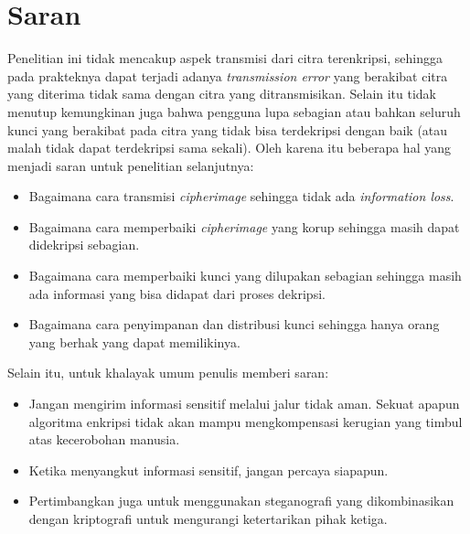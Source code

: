 \section{Saran}
Penelitian ini tidak mencakup aspek transmisi dari citra terenkripsi, sehingga pada prakteknya dapat
terjadi adanya \emph{transmission error} yang berakibat citra yang diterima tidak sama dengan citra 
yang ditransmisikan. Selain itu tidak menutup kemungkinan juga bahwa pengguna lupa sebagian atau 
bahkan seluruh kunci yang berakibat pada citra yang tidak bisa terdekripsi dengan baik (atau malah 
tidak dapat terdekripsi sama sekali). Oleh karena itu beberapa hal yang menjadi saran untuk penelitian
selanjutnya:
\begin{itemize}
\item Bagaimana cara transmisi \emph{cipherimage} sehingga tidak ada \emph{information loss}.
\item Bagaimana cara memperbaiki \emph{cipherimage} yang korup sehingga masih dapat didekripsi sebagian.
\item Bagaimana cara memperbaiki kunci yang dilupakan sebagian sehingga masih ada informasi yang bisa didapat dari proses dekripsi.
\item Bagaimana cara penyimpanan dan distribusi kunci sehingga hanya orang yang berhak yang dapat memilikinya.
\end{itemize}
Selain itu, untuk khalayak umum penulis memberi saran:
\begin{itemize}
\item Jangan mengirim informasi sensitif melalui jalur tidak aman. Sekuat apapun algoritma enkripsi tidak
akan mampu mengkompensasi kerugian yang timbul atas kecerobohan manusia.
\item Ketika menyangkut informasi sensitif, jangan percaya siapapun.
\item Pertimbangkan juga untuk menggunakan steganografi yang dikombinasikan dengan kriptografi untuk
mengurangi ketertarikan pihak ketiga.
\end{itemize}

\newpage